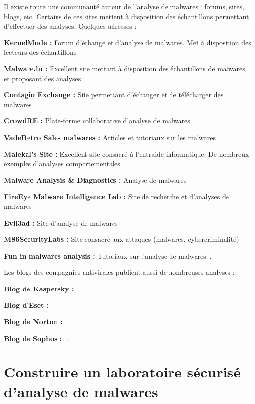 Il existe toute une communauté autour de l'analyse de malwares : forums, sites, blogs, etc. Certains de ces sites mettent à disposition des échantillons permettant d'effectuer des analyses. Quelques adresses :
\begin{list}{•}{}
\item \textbf{KernelMode : }Forum d’échange et d’analyse de malwares. Met à disposition des lecteurs des échantillons~\cite{mal1} 
\item  \textbf{Malware.lu : }Excellent site mettant à disposition des échantillons de malwares et proposant des analyses~\cite{mal2}
\item \textbf{Contagio Exchange : }Site permettant d'échanger et de télécharger des malwares~\cite{mal3}
\item \textbf{CrowdRE : }Plate-forme collaborative d'analyse de malwares~\cite{mal4}
\item \textbf{VadeRetro Sales malwares : }Articles et tutoriaux sur les malwares~\cite{mal5}
\item \textbf{Malekal's Site : }Excellent site consacré à l'entraide informatique. De nombreux exemples d'analyses comportementales~\cite{mal6}
\item \textbf{Malware Analysis \& Diagnostics : }Analyse de malwares~\cite{mal7} 
\item \textbf{FireEye Malware Intelligence Lab : }Site de recherche et d'analyses de malwares~\cite{mal8}
\item \textbf{Evil3ad : }Site d'analyse de malwares~\cite{mal9}
\item \textbf{M86SecurityLabs : }Site consacré aux attaques (malwares, cybercriminalité)~\cite{mal10}
\item \textbf{Fun in malwares analysis :} Tutoriaux sur l'analyse de malwares~\cite{mal11}.\\
\end{list}



Les blogs des compagnies antivirales publient aussi de nombreuses analyses :
\begin{list}{•}{}
\item \textbf{Blog de Kaspersky : }~\cite{blog1}
\item \textbf{Blog d'Eset : }~\cite{blog2} 
\item \textbf{Blog de Norton : }~\cite{blog3}
\item \textbf{Blog de Sophos : }~\cite{blog4}.\\
\end{list}
\section{Construire un laboratoire sécurisé d'analyse de malwares}

